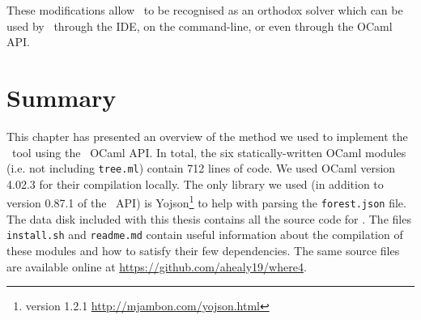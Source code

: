 These modifications allow \where~to be recognised as an orthodox solver which can be used by \why~through the IDE, on the command-line, or even through the OCaml API. 

\section{Summary}

This chapter has presented an overview of the method we used to implement the \where~tool using the \why~OCaml API.
In total, the six statically-written OCaml modules (i.e. not including \texttt{tree.ml}) contain 712 lines of code.
We used OCaml version 4.02.3 for their compilation locally.
The only library we used (in addition to version 0.87.1 of the \why~API) is Yojson\footnote{version 1.2.1 \url{http://mjambon.com/yojson.html}}  to help with parsing the \texttt{forest.json} file. 
The data disk included with this thesis contains all the source code for \where. 
The files \texttt{install.sh} and \texttt{readme.md} contain useful information about the compilation of these modules and how to satisfy their few dependencies.
The same source files are available online at \url{https://github.com/ahealy19/where4}.

